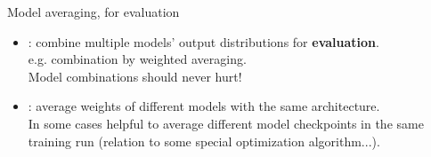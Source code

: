 \begin{frame}{Model averaging, for evaluation}
\begin{itemize}
\item {}: combine multiple models' output distributions for \textbf{evaluation}.\\
e.g. combination by weighted averaging.\\
Model combinations should never hurt! 
\item {}: average weights of different models with the same architecture.\\
In some cases helpful to average different model checkpoints in the same training run (relation to some special optimization algorithm...).
\end{itemize}
\end{frame}


